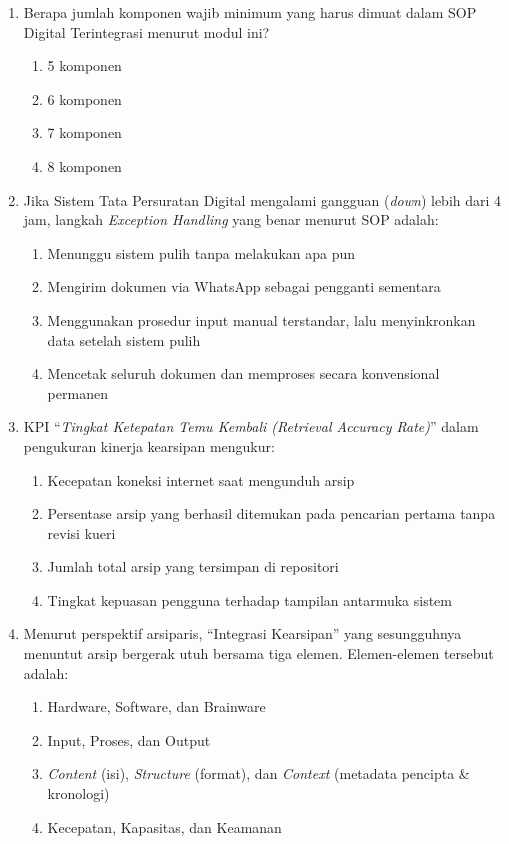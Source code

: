\documentclass[12pt,a4paper]{report}
\begin{document}
\begin{enumerate}[leftmargin=*, itemsep=0.5cm]
\item Berapa jumlah komponen wajib minimum yang harus dimuat dalam SOP Digital Terintegrasi menurut modul ini?
\begin{enumerate}[label=\Alph*., nosep]
    \item 5 komponen
    \item 6 komponen
    \item 7 komponen
    \item 8 komponen
\end{enumerate}

\item Jika Sistem Tata Persuratan Digital mengalami gangguan (\textit{down}) lebih dari 4 jam, langkah \textit{Exception Handling} yang benar menurut SOP adalah:
\begin{enumerate}[label=\Alph*., nosep]
    \item Menunggu sistem pulih tanpa melakukan apa pun
    \item Mengirim dokumen via WhatsApp sebagai pengganti sementara
    \item Menggunakan prosedur input manual terstandar, lalu menyinkronkan data setelah sistem pulih
    \item Mencetak seluruh dokumen dan memproses secara konvensional permanen
\end{enumerate}

\item KPI ``\textit{Tingkat Ketepatan Temu Kembali (Retrieval Accuracy Rate)}'' dalam pengukuran kinerja kearsipan mengukur:
\begin{enumerate}[label=\Alph*., nosep]
    \item Kecepatan koneksi internet saat mengunduh arsip
    \item Persentase arsip yang berhasil ditemukan pada pencarian pertama tanpa revisi kueri
    \item Jumlah total arsip yang tersimpan di repositori
    \item Tingkat kepuasan pengguna terhadap tampilan antarmuka sistem
\end{enumerate}

\item Menurut perspektif arsiparis, ``Integrasi Kearsipan'' yang sesungguhnya menuntut arsip bergerak utuh bersama tiga elemen. Elemen-elemen tersebut adalah:
\begin{enumerate}[label=\Alph*., nosep]
    \item Hardware, Software, dan Brainware
    \item Input, Proses, dan Output
    \item \textit{Content} (isi), \textit{Structure} (format), dan \textit{Context} (metadata pencipta \& kronologi)
    \item Kecepatan, Kapasitas, dan Keamanan
\end{enumerate}

\end{enumerate}
\end{document}
